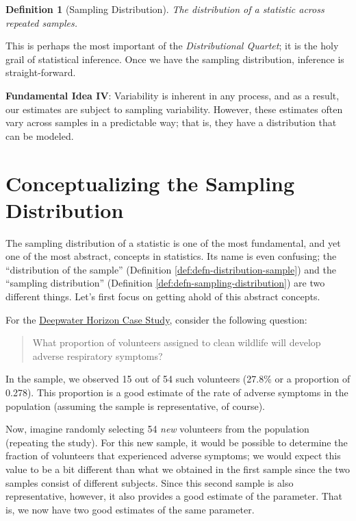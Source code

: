 \documentclass[
]{book}
\theoremstyle{plain}
\theoremstyle{mydefn}
\newtheorem{definition}{Definition}[chapter]
\theoremstyle{myexmpl}
\theoremstyle{remark}
\begin{document}
\begin{definition}[Sampling Distribution]
\protect\hypertarget{def:defn-sampling-distribution}{}{\label{def:defn-sampling-distribution} {} }The distribution of a \emph{statistic} across repeated samples.
\end{definition}

This is perhaps the most important of the \emph{Distributional Quartet}; it is the holy grail of statistical inference. Once we have the sampling distribution, inference is straight-forward.

\begin{rmdfivefund}
\textbf{Fundamental Idea IV}: Variability is inherent in any process, and as a result, our estimates are subject to sampling variability. However, these estimates often vary across samples in a predictable way; that is, they have a distribution that can be modeled.
\end{rmdfivefund}

\hypertarget{conceptualizing-the-sampling-distribution}{%
\section{Conceptualizing the Sampling Distribution}\label{conceptualizing-the-sampling-distribution}}

The sampling distribution of a statistic is one of the most fundamental, and yet one of the most abstract, concepts in statistics. Its name is even confusing; the ``distribution of the sample'' (Definition \ref{def:defn-distribution-sample}) and the ``sampling distribution'' (Definition \ref{def:defn-sampling-distribution}) are two different things. Let's first focus on getting ahold of this abstract concepts.

For the \protect\hyperlink{DeepwaterCase}{Deepwater Horizon Case Study}, consider the following question:

\begin{quote}
What proportion of volunteers assigned to clean wildlife will develop adverse respiratory symptoms?
\end{quote}

In the sample, we observed 15 out of 54 such volunteers (27.8\% or a proportion of 0.278). This proportion is a good estimate of the rate of adverse symptoms in the population (assuming the sample is representative, of course).

Now, imagine randomly selecting 54 \emph{new} volunteers from the population (repeating the study). For this new sample, it would be possible to determine the fraction of volunteers that experienced adverse symptoms; we would expect this value to be a bit different than what we obtained in the first sample since the two samples consist of different subjects. Since this second sample is also representative, however, it also provides a good estimate of the parameter. That is, we now have two good estimates of the same parameter.
\end{document}
